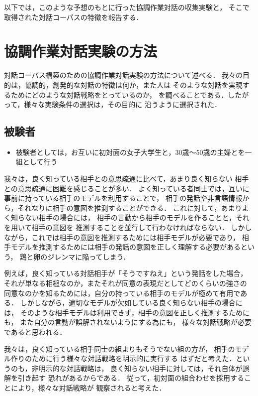 以下では，このような予想のもとに行った協調作業対話の収集実験と，
そこで取得された対話コーパスの特徴を報告する．

\section{協調作業対話実験の方法}

対話コーパス構築のための協調作業対話実験の方法について述べる．
我々の目的は，協調的，創発的な対話の特徴は何か，また人は
そのような対話を実現するためにどのような対話戦略をとっているのか，
を調べることである．したがって，様々な実験条件の選択は，その目的に
沿うように選択された．

\subsection{被験者}

\begin{itemize}
\item 被験者としては，お互いに初対面の女子大学生と，30歳〜50歳の主婦とを一組として行う
\end{itemize}

我々は，良く知っている相手との意思疏通に比べて，あまり良く知らない
相手との意思疏通に困難を感じることが多い．
よく知っている者同士では，互いに事前に持っている相手のモデルを利用することで，
相手の発話や非言語情報から，それなりに相手の意図を推測することができる．
これに対して，あまりよく知らない相手の場合には，
相手の言動から相手のモデルを作ることと，それを用いて相手の意図を
推測することを並行して行わなければならない．
しかしながら，これでは相手の意図を推測するためには相手モデルが必要であり，
相手モデルを推測するためには相手の発話の意図を正しく理解する必要があるという，
鶏と卵のジレンマに陥ってしまう．

例えば，良く知っている対話相手が「そうですねえ」という発話をした場合，
それが単なる相槌なのか，またそれが同意の表現だとしてどのくらいの強さの
同意なのかを知るためには，自分の持っている相手のモデルが極めて有用である．
しかしながら，適切なモデルが欠如している良く知らない相手の場合には，
そのような相手モデルは利用できず，相手の意図を正しく推測するためにも，
また自分の言動が誤解されないようにする為にも，
様々な対話戦略が必要であると思われる．

我々は，良く知っている相手同士の組よりもそうでない組の方が，
相手のモデル作りのために行う様々な対話戦略を明示的に実行する
はずだと考えた．というのも，非明示的な対話戦略は，
良く知らない相手に対しては，それ自体が誤解を引き起す
恐れがあるからである．
従って，初対面の組合わせを採用することにより，様々な対話戦略が
観察されると考えた．

